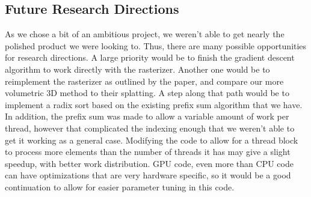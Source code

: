 \documentclass[12pt, a4paper, twocolumn]{article}
\begin{document}
\subsection{Future Research Directions}
As we chose a bit of an ambitious project, we weren't able to get nearly the polished product we were looking to. Thus, there are many possible opportunities for research directions. A large priority would be to finish the gradient descent algorithm to work directly with the rasterizer. Another one would be to reimplement the rasterizer as outlined by the paper, and compare our more volumetric 3D method to their splatting. A step along that path would be to implement a radix sort based on the existing prefix sum algorithm that we have. In addition, the prefix sum was made to allow a variable amount of work per thread, however that complicated the indexing enough that we weren't able to get it working as a general case. Modifying the code to allow for a thread block to process more elements than the number of threads it has may give a slight speedup, with better work distribution. GPU code, even more than CPU code can have optimizations that are very hardware specific, so it would be a good continuation to allow for easier parameter tuning in this code.




\nocite{*}


\end{document}
